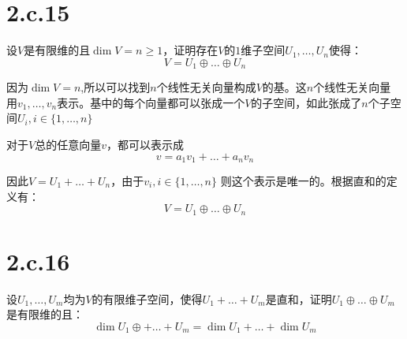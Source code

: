 \documentclass[10pt,a4paper,UTF8]{article}
\begin{document}
\section{2.c.15}
\label{sec:org7be125f}


\begin{problem}
设\(V\)是有限维的且\(\dim V=n\geq 1\)，证明存在\(V\)的\(1\)维子空间\(U_{1},\ldots ,U_{n}\)使得：
\begin{equation}
\label{eq:15}
V=U_{1}\oplus \ldots \oplus U_{n}
\end{equation}
\end{problem}

\begin{answer}
因为\(\dim V = n\),所以可以找到\(n\)个线性无关向量构成\(V\)的基。这\(n\)个线性无关向量 用\(v_{1},\ldots ,v_{n}\)表示。基中的每个向量都可以张成一个\(V\)的子空间，如此张成了\(n\)个子空间\(U_{i},i\in \{1,\ldots ,n\}\) 

对于\(V\)总的任意向量\(v\)，都可以表示成
\begin{equation}
\label{eq:16}
v= a_{1}v_{1} + \ldots + a_{n}v_{n}
\end{equation}

因此\(V = U_{1}+ \ldots +U_{n}\)，由于\(v_{i},i\in \{1,\ldots ,n\}\) 则这个表示是唯一的。根据直和的定义有：
\begin{equation}
\label{eq:17}
V = U_{1}\oplus \ldots \oplus U_{n}
\end{equation}
\end{answer}
\section{2.c.16}
\label{sec:org7131aaf}


\begin{problem}
设\(U_{1},\ldots ,U_{m}\)均为\(V\)的有限维子空间，使得\(U_{1}+ \ldots +U_{m}\)是直和，证明\(U_{1} \oplus \ldots \oplus U_{m}\)是有限维的且：
\begin{equation}
\label{eq:18}
\dim U_{1}\oplus + \ldots + U_{m} = \dim U_{1} + \ldots + \dim U_{m}
\end{equation}
\end{problem}
\end{document}
